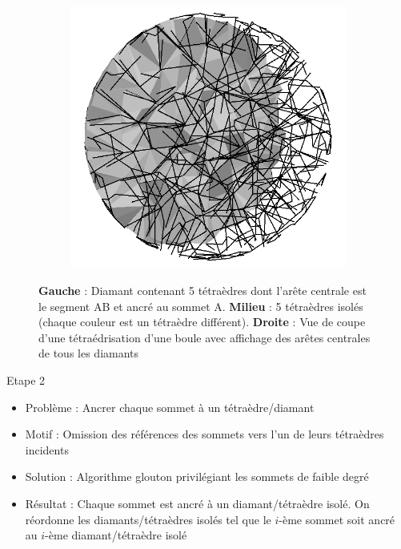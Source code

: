 \documentclass[9pt]{beamer}
\begin{document}
\begin{frame}
\begin{figure}[H]
\begin{subfigure}{.32\textwidth}
  \caption{}
  \label{fig:explosion_diamond}
\end{subfigure}
\begin{subfigure}{.32\textwidth}
  \centering
  \includegraphics[scale=0.12]{Images/central_edges}
  \caption{}
\end{subfigure}
\caption{\textbf{Gauche} : Diamant contenant 5 tétraèdres dont l'arête centrale est le segment AB et ancré au sommet A. \textbf{Milieu} : 5 tétraèdres isolés (chaque couleur est un tétraèdre différent). \textbf{Droite} : Vue de coupe d'une tétraédrisation d'une boule avec affichage des arêtes centrales de tous les diamants}
\end{figure}

\begin{block}{Etape 2}
\begin{itemize}
\item Problème : Ancrer chaque sommet à un tétraèdre/diamant
\item Motif : Omission des références des sommets vers l'un de leurs tétraèdres incidents
\item Solution : Algorithme glouton privilégiant les sommets de faible degré
\item Résultat : Chaque sommet est ancré à un diamant/tétraèdre isolé. On réordonne les diamants/tétraèdres isolés tel que le $i$-ème sommet soit ancré au $i$-ème diamant/tétraèdre isolé
\end{itemize}
\end{block}
\end{frame}
\end{document}
